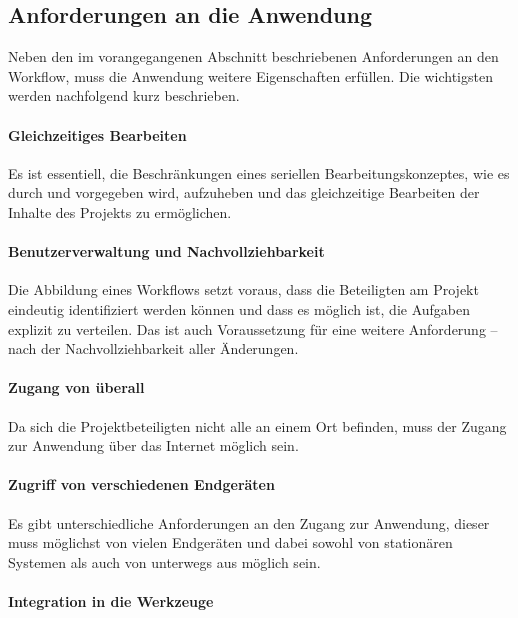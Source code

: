 \pagebreak

\subsection{Anforderungen an die Anwendung}\label{l:anforderungen}

Neben den im vorangegangenen Abschnitt beschriebenen Anforderungen an den Workflow, muss die Anwendung weitere Eigenschaften erfüllen. Die wichtigsten werden nachfolgend kurz beschrieben.

\paragraph{Gleichzeitiges Bearbeiten}

Es ist essentiell, die Beschränkungen eines seriellen Bearbeitungskonzeptes, wie es durch  und  vorgegeben wird, aufzuheben und das gleichzeitige Bearbeiten der Inhalte des Projekts zu ermöglichen. 

\paragraph{Benutzerverwaltung und Nachvollziehbarkeit}

Die Abbildung eines Workflows setzt voraus, dass die Beteiligten am Projekt eindeutig identifiziert werden können und dass es möglich ist, die Aufgaben explizit zu verteilen. Das ist auch Voraussetzung für eine weitere Anforderung -- nach der Nachvollziehbarkeit aller Änderungen.

\paragraph{Zugang von überall}

Da sich die Projektbeteiligten nicht alle an einem Ort befinden, muss der Zugang zur Anwendung über das Internet möglich sein.

\paragraph{Zugriff von verschiedenen Endgeräten}

Es gibt unterschiedliche Anforderungen an den Zugang zur Anwendung, dieser muss möglichst von vielen Endgeräten und dabei sowohl von stationären Systemen als auch von unterwegs aus möglich sein.

\paragraph{Integration in die Werkzeuge}

